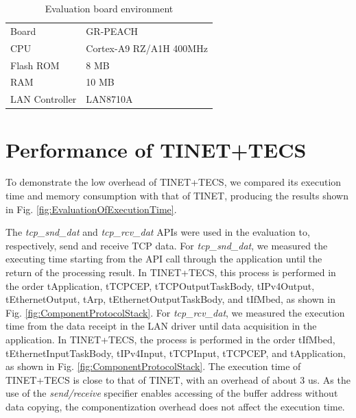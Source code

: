 \documentclass[a4j,12pt,oneside,openany,english]{jsbook}
\begin{document}
\begin{table}[t]
    \centering
    \caption{Evaluation board environment}
    \begin{tabular}{l|l}
        \hline\hline
        Board           &   GR-PEACH                \\
        CPU             &   Cortex-A9 RZ/A1H 400MHz \\
        Flash ROM       &   8 MB                    \\
        RAM             &   10 MB                   \\
        LAN Controller  &   LAN8710A                \\
        \hline
    \end{tabular}
    \label{tab:EvaluationBoardEnvironment}
\end{table}

\section{Performance of TINET+TECS}

To demonstrate the low overhead of TINET+TECS, we compared its execution time and memory consumption with that of TINET, producing the results shown in Fig. \ref{fig:EvaluationOfExecutionTime}.

The {\it tcp\_snd\_dat} and {\it tcp\_rcv\_dat} APIs were used in the evaluation to, respectively, send and receive TCP data.
For {\it tcp\_snd\_dat}, we measured the executing time starting from the API call through the application until the return of the processing result.
In TINET+TECS, this process is performed in the order tApplication, tTCPCEP, tTCPOutputTaskBody, tIPv4Output, tEthernetOutput, tArp, tEthernetOutputTaskBody, and tIfMbed, as shown in Fig. \ref{fig:ComponentProtocolStack}.
For {\it tcp\_rcv\_dat}, we measured the execution time from the data receipt in the LAN driver until data acquisition in the application.
In TINET+TECS, the process is performed in the order tIfMbed, tEthernetInputTaskBody, tIPv4Input, tTCPInput, tTCPCEP, and tApplication, as shown in Fig. \ref{fig:ComponentProtocolStack}.
The execution time of TINET+TECS is close to that of TINET, with an overhead of about 3 us.
As the use of the {\it send/receive} specifier enables accessing of the buffer address without data copying, the componentization overhead does not affect the execution time.
\end{document}
